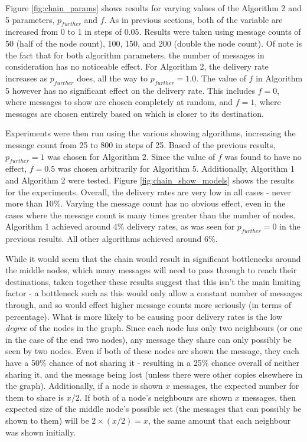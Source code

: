 \documentclass[bsc,frontabs,twoside,singlespacing,parskip,deptreport]{infthesis}     %
\begin{document}
Figure \ref{fig:chain_params} shows results for varying values of the Algorithm 2 and 5 parameters, $p_{further}$ and $f$. As in previous sections, both of the variable are increased from 0 to 1 in steps of 0.05. Results were taken using message counts of 50 (half of the node count), 100, 150, and 200 (double the node count). Of note is the fact that for both algorithm parameters, the number of messages in consideration has no noticeable effect. For Algorithm 2, the delivery rate increases as $p_{further}$ does, all the way to $p_{further}=1.0$. The value of $f$ in Algorithm 5 however has no significant effect on the delivery rate. This includes $f=0$, where messages to show are chosen completely at random, and $f=1$, where messages are chosen entirely based on which is closer to its destination.

Experiments were then run using the various showing algorithms, increasing the message count from 25 to 800 in steps of 25. Based of the previous results, $p_{further}=1$ was chosen for Algorithm 2. Since the value of $f$ was found to have no effect, $f=0.5$ was chosen arbitrarily for Algorithm 5. Additionally, Algorithm 1 and Algorithm 2 were tested. Figure \ref{fig:chain_show_models} shows the results for the experiments. Overall, the delivery rates are very low in all cases - never more than 10\%. Varying the message count has no obvious effect, even in the cases where the message count is many times greater than the number of nodes. Algorithm 1 achieved around 4\% delivery rates, as was seen for $p_{further}=0$ in the previous results. All other algorithms achieved around 6\%.

While it would seem that the chain would result in significant bottlenecks around the middle nodes, which many messages will need to pass through to reach their destinations, taken together these results suggest that this isn't the main limiting factor - a bottleneck such as this would only allow a constant number of messages through, and so would effect higher message counts more seriously (in terms of percentage). What is more likely to be causing poor delivery rates is the low \textit{degree} of the nodes in the graph. Since each node has only two neighbours (or one in the case of the end two nodes), any message they share can only possibly be seen by two nodes. Even if both of these nodes are shown the message, they each have a 50\% chance of not sharing it - resulting in a 25\% chance overall of neither sharing it, and the message being lost (unless there were other copies elsewhere in the graph). Additionally, if a node is shown $x$ messages, the expected number for them to share is $x/2$. If both of a node's neighbours are shown $x$ messages, then expected size of the middle node's possible set (the messages that can possibly be shown to them) will be $2 \times (x/2) = x$, the same amount that each neighbour was shown initially.
\end{document}
